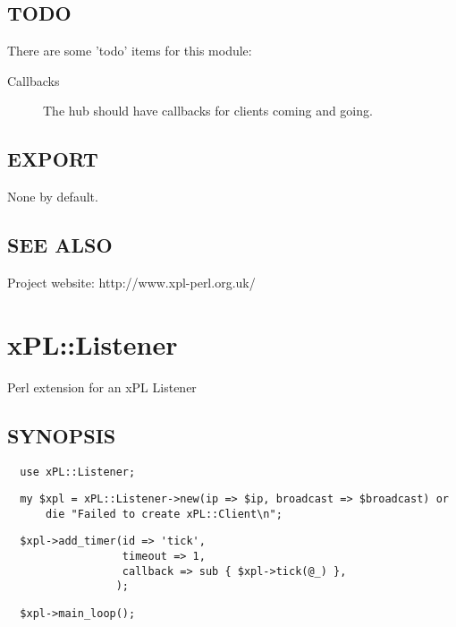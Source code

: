 \subsection*{TODO\label{xPL::Hub_TODO}}


There are some 'todo' items for this module:

\begin{description}

\item[{Callbacks}] \mbox{}

The hub should have callbacks for clients coming and going.

\end{description}
\subsection*{EXPORT\label{xPL::Hub_EXPORT}}


None by default.

\subsection*{SEE ALSO\label{xPL::Hub_SEE_ALSO}}


Project website: http://www.xpl-perl.org.uk/

\section{xPL::Listener\label{xPL::Listener}}


Perl extension for an xPL Listener

\subsection*{SYNOPSIS\label{xPL::Listener_SYNOPSIS}}
\begin{verbatim}
  use xPL::Listener;
\end{verbatim}
\begin{verbatim}
  my $xpl = xPL::Listener->new(ip => $ip, broadcast => $broadcast) or
      die "Failed to create xPL::Client\n";
\end{verbatim}
\begin{verbatim}
  $xpl->add_timer(id => 'tick',
                  timeout => 1,
                  callback => sub { $xpl->tick(@_) },
                 );
\end{verbatim}
\begin{verbatim}
  $xpl->main_loop();
\end{verbatim}
